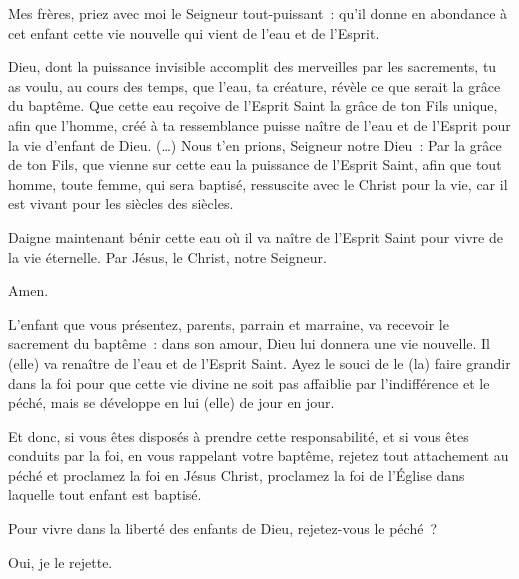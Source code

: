 
Mes frères, priez avec moi le Seigneur tout-puissant~:
qu'il donne en abondance à cet enfant cette vie nouvelle qui
vient de l'eau et de l'Esprit.


Dieu, dont la puissance invisible accomplit des merveilles par
les sacrements, tu as voulu, au cours des temps, que l'eau, ta
créature, révèle ce que serait la grâce du baptême. Que cette
eau reçoive de l'Esprit Saint la grâce de ton Fils unique, afin
que l'homme, créé à ta ressemblance puisse naître de l'eau et de
l'Esprit pour la vie d'enfant de Dieu. (…) Nous t'en prions,
Seigneur notre Dieu : Par la grâce de ton Fils, que vienne sur
cette eau la puissance de l'Esprit Saint, afin que tout homme,
toute femme, qui sera baptisé, ressuscite avec le Christ pour
la vie, car il est vivant pour les siècles des siècles.


Daigne maintenant bénir \grecross{} cette eau où il va naître de
l'Esprit Saint pour vivre de la vie éternelle. Par Jésus,
le Christ, notre Seigneur.

 Amen.

\pars{}


L'enfant que vous présentez, parents, parrain et marraine, va recevoir
le sacrement du baptême~: dans son amour, Dieu lui donnera une vie nouvelle.
Il (elle) va renaître de l'eau et de l'Esprit Saint. Ayez le souci de le
(la) faire grandir dans la foi pour que cette vie divine ne soit pas
affaiblie par l'indifférence et le péché, mais se développe en lui (elle)
de jour en jour.

Et donc, si vous êtes disposés à prendre cette responsabilité, et si vous
êtes conduits par la foi, en vous rappelant votre baptême, rejetez tout
attachement au péché et proclamez la foi en Jésus Christ, proclamez la
foi de l'Église dans laquelle tout enfant est baptisé.

 Pour vivre dans
la liberté des enfants de Dieu, rejetez-vous le péché~?

 Oui, je le rejette.


